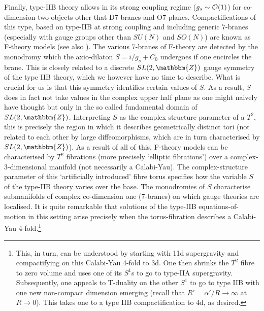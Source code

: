 \documentclass[12pt]{article}
\numberwithin{equation}{section}
\begin{document}
Finally, type-IIB theory allows in its strong coupling regime ($g_s\sim {\cal O}(1)$) for co-dimension-two objects other that D7-branes and O7-planes. Compactifications of this type, based on type-IIB at strong coupling and including generic 7-branes (especially with gauge groups other than $SU(N)$ and $SO(N)$) are known as F-theory models \cite{Vafa:1996xn} (see also \cite{Sen:1996vd, Denef:2008wq, Weigand:2010wm, Heckman:2010bq}). The various 7-branes of F-theory are detected by the monodromy which the axio-dilaton $S=i/g_s+C_0$ undergoes if one encircles the brane. This is closely related to a discrete $SL(2,\mathbbm{Z})$ gauge symmetry of the type IIB theory, which we however have no time to describe. What is crucial for us is that this symmetry identifies certain values of $S$. As a result, $S$ does in fact not take values in the complex upper half plane as one might naively have thought but only in the so called fundamental domain of $SL(2,\mathbbm{Z})$. Interpreting $S$ as the complex structure parameter of a $T^2$, this is precisely the region in which it describes geometrically distinct tori (not related to each other by large diffeomorphisms, which are in turn characterised by $SL(2,\mathbbm{Z})$). As a result of all of this, F-theory models can be characterised by $T^2$ fibrations (more precisely `elliptic fibrations') over a complex-3-dimensional manifold (not necessarily a Calabi-Yau). The complex-structure parameter of this `artificially introduced' fibre torus specifies how the variable $S$ of the type-IIB theory varies over the base. The monodromies of $S$ characterise submanifolds of complex co-dimension one (7-branes) on which gauge theories are localised. It is quite remarkable that solutions of the type-IIB equations-of-motion in this setting arise precisely when the torus-fibration describes a Calabi-Yau 4-fold.\footnote{This, 
in turn, can be understood by starting with 11d supergravity and compactifying on this Calabi-Yau 4-fold to 3d. One then shrinks the $T^2$ fibre to zero volume and uses one of its $S^1$s to go to type-IIA supergravity. Subsequently, one appeals to T-duality on the other $S^1$ to go to type IIB with one new non-compact dimension emerging (recall that $R'=\alpha'/R\to \infty$ at $R\to 0$). This takes one to a type IIB compactification to 4d, as desired.}
\end{document}

